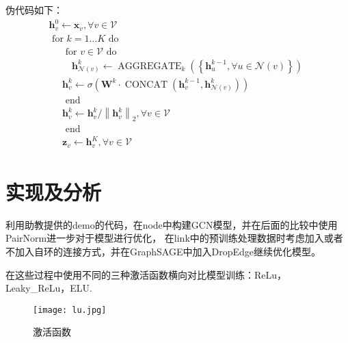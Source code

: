 \documentclass[a4paper,AutoFakeBold,AutoFakeSlant]{ctexart}
\begin{document}
伪代码如下：
\begin{equation}
  \begin{array}{l}
    \mathbf{h}_{v}^{0} \leftarrow \mathbf{x}_{v}, \forall v \in \mathcal{V} \\
    \text { for } k=1 \ldots K \text { do } \\
    \quad \begin{array}{l}
    \text { for } v \in \mathcal{V} \text { do } \\
    \quad \mathbf{h}_{\mathcal{N}(v)}^{k} \leftarrow \operatorname{AGGREGATE}_{k}\left(\left\{\mathbf{h}_{u}^{k-1}, \forall u \in \mathcal{N}(v)\right\}\right) \\
    \mathbf{h}_{v}^{k} \leftarrow \sigma\left(\mathbf{W}^{k} \cdot \operatorname{CONCAT}\left(\mathbf{h}_{v}^{k-1}, \mathbf{h}_{\mathcal{N}(v)}^{k}\right)\right) \\
    \text { end } \\
    \mathbf{h}_{v}^{k} \leftarrow \mathbf{h}_{v}^{k} /\left\|\mathbf{h}_{v}^{k}\right\|_{2}, \forall v \in \mathcal{V} \\
    \text { end } \\
    \mathbf{z}_{v} \leftarrow \mathbf{h}_{v}^{K}, \forall v \in \mathcal{V}
    \end{array}
    \end{array}
\end{equation}


\section{实现及分析}
利用助教提供的demo的代码，在node中构建GCN模型，并在后面的比较中使用PairNorm进一步对于模型进行优化，
在link中的预训练处理数据时考虑加入或者不加入自环的连接方式，并在GraphSAGE中加入DropEdge继续优化模型。

在这些过程中使用不同的三种激活函数横向对比模型训练：ReLu，Leaky\_ReLu，ELU.
\begin{figure}[htbp]
  \centering
  \texttt{[image: lu.jpg]}
  \caption{激活函数}
  \label{f2}
\end{figure}
\end{document}
